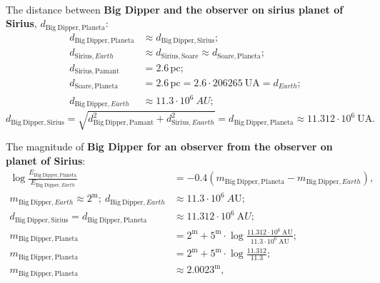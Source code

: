 \begin{description}
\begin{align*}
  \end{align*}
\item[f)] The distance between \textbf{Big Dipper and the observer on sirius
  planet of Sirius}, %
  $d_{\mathrm{Big\ Dipper,Planeta}}$:
  \begin{align*}
  d_{\mathrm{Big\ Dipper,Planeta}}
    &\approx d_{\mathrm{Big\ Dipper,Sirius}};\\
  d_{\mathrm{Sirius},Earth} &\approx d_{\mathrm{Sirius,Soare}}
    \approx d_{\mathrm{Soare,Planeta}};\\
  d_{\mathrm{Sirius,Pamant}} &= 2.6\,\mathrm{pc};\\
  d_{\mathrm{Soare,Planeta}} &= 2.6\,\mathrm{pc}
    = 2.6\cdot206265\ \mathrm{UA} = d_{Earth};\\
  d_{\mathrm{Big\ Dipper},Earth} &\approx 11.3\cdot10^{6}\ AU;
  \end{align*}
  \[ d_{\mathrm{Big\ Dipper,Sirius}}
     = \sqrt{d_{\mathrm{Big\ Dipper,Pamant}}^2
       + d_{\mathrm{Sirius},Eaarth}^2} %
     = d_{\mathrm{Big\ Dipper,Planeta}}
     \approx 11.312\cdot10^{6}\ \mathrm{UA}. \]
\item[g)] The magnitude of \textbf{Big Dipper for an observer from the
  observer on planet of Sirius}: %
  \begin{align*}
  \log\frac{E_{\mathrm{Big\ Dipper,Planeta}}}
           {E_{\mathrm{Big\ Dipper},Earth}}
    &= -0.4\left(m_{\mathrm{Big\ Dipper,Planeta}}
       - m_{\mathrm{Big\ Dipper},Earth}\right),\\
  m_{\mathrm{Big\ Dipper},Earth} \approx 2^{\mathrm{m}};\
  d_{\mathrm{Big\ Dipper},Earth} &\approx 11.3\cdot10^{6}\ A\mathrm{U};\\
  d_{\mathrm{Big\ Dipper,Sirius}} = d_{\mathrm{Big\ Dipper,Planeta}}
    &\approx 11.312\cdot10^{6}\ \mathrm{A}U;\\
  m_{\mathrm{Big\ Dipper,Planeta}}
    &= 2^{\mathrm{m}} + 5^{\mathrm{m}}\cdot
       \log\frac{11.312\cdot10^{6}\ \mathrm{AU}}
                {11.3\cdot10^{6}\ \mathrm{AU}};\\
  m_{\mathrm{Big\ Dipper,Planeta}}
    &= 2^{\mathrm{m}} + 5^{\mathrm{m}}\cdot
       \log\frac{11.312}{11.3};\\
  m_{\mathrm{Big\ Dipper,Planeta}} &\approx 2.0023^{\mathrm{m}},
  \end{align*}
\end{description}

